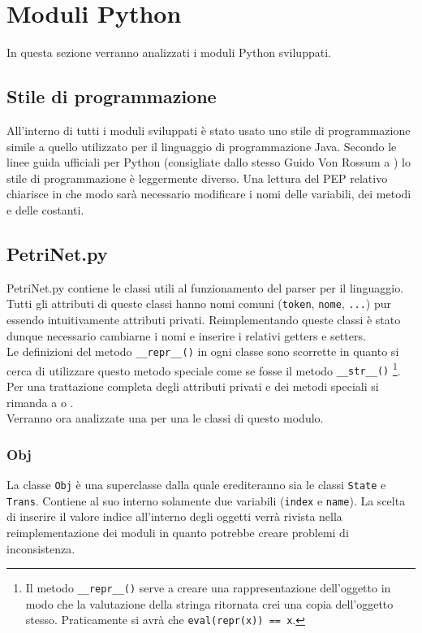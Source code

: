 \documentclass[italian,12pt]{book}
\begin{document}
\section{Moduli Python}
In questa sezione verranno analizzati i moduli Python sviluppati.

\subsection{Stile di programmazione}
All'interno di tutti i moduli sviluppati è stato usato uno stile di programmazione simile a quello
utilizzato per il linguaggio di programmazione Java. Secondo le linee guida ufficiali per Python 
(consigliate dallo stesso Guido Von Rossum a \cite{PYTHCODESTYLE}) lo stile di programmazione 
è leggermente diverso. Una lettura del PEP relativo chiarisce in che modo sarà necessario modificare 
i nomi delle variabili, dei metodi e delle costanti.

\subsection{PetriNet.py}
PetriNet.py contiene le classi utili al funzionamento del parser per il linguaggio.\\
Tutti gli attributi di queste classi hanno nomi comuni ({\tt token}, {\tt nome}, {\tt ...}) pur 
essendo intuitivamente attributi privati. Reimplementando queste classi è stato dunque necessario
cambiarne i nomi e inserire i relativi getters e setters. \\
Le definizioni del metodo {\tt \_\_repr\_\_()} in ogni classe sono scorrette in quanto si cerca di 
utilizzare questo metodo speciale come se fosse il metodo {\tt \_\_str\_\_()}
\footnote{Il metodo {\tt \_\_repr\_\_()} serve a creare una rappresentazione dell'oggetto in modo che
la valutazione della stringa ritornata crei una copia dell'oggetto stesso. Praticamente si avrà che 
{\tt eval(repr(x)) == x}.}. \\
Per una trattazione completa degli attributi privati e dei metodi speciali 
si rimanda a \cite{PYTH} o \cite {SUMMERFIELD}.\\
Verranno ora analizzate una per una le classi di questo modulo.

\subsubsection{Obj}
La classe {\tt Obj} è una superclasse dalla quale erediteranno sia le classi {\tt State} e 
{\tt Trans}. Contiene al suo interno solamente due variabili ({\tt index} e {\tt name}). La 
scelta di inserire il valore indice all'interno degli oggetti verrà rivista nella reimplementazione 
dei moduli in quanto potrebbe creare problemi di inconsistenza.
\end{document}
